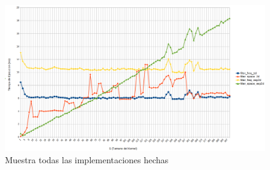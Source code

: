 \documentclass[11 pt,oneside]{article}
\begin{document}
\begin{figure}[H]
\centering
\includegraphics[width=17cm]{todos}
\caption{Muestra todas las implementaciones hechas} \label{fig:2d}
\end{figure} 

\clearpage
\end{document}
